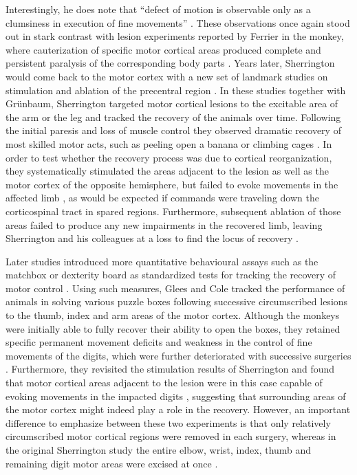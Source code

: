 Interestingly, he does note that \enquote{defect of motion is observable only as a clumsiness in execution of fine movements} \cite{Sherrington1885}. These observations once again stood out in stark contrast with lesion experiments reported by Ferrier in the monkey, where cauterization of specific motor cortical areas produced complete and persistent paralysis of the corresponding body parts \cite{Ferrier1884}. Years later, Sherrington would come back to the motor cortex with a new set of landmark studies on stimulation and ablation of the precentral region \cite{GrahamBrown1913,Leyton1917}. In these studies together with Gr\"unbaum, Sherrington targeted motor cortical lesions to the excitable area of the arm or the leg and tracked the recovery of the animals over time. Following the initial paresis and loss of muscle control they observed dramatic recovery of most skilled motor acts, such as peeling open a banana or climbing cages \cite{Leyton1917}. In order to test whether the recovery process was due to cortical reorganization, they systematically stimulated the areas adjacent to the lesion as well as the motor cortex of the opposite hemisphere, but failed to evoke movements in the affected limb \cite{Leyton1917}, as would be expected if commands were traveling down the corticospinal tract in spared regions. Furthermore, subsequent ablation of those areas failed to produce any new impairments in the recovered limb, leaving Sherrington and his colleagues at a loss to find the locus of recovery \cite{Leyton1917}.

Later studies introduced more quantitative behavioural assays such as the matchbox or dexterity board as standardized tests for tracking the recovery of motor control \cite{Glees1950,Cole1952}. Using such measures, Glees and Cole tracked the performance of animals in solving various puzzle boxes following successive circumscribed lesions to the thumb, index and arm areas of the motor cortex. Although the monkeys were initially able to fully recover their ability to open the boxes, they retained specific permanent movement deficits and weakness in the control of fine movements of the digits, which were further deteriorated with successive surgeries \cite{Glees1950}. Furthermore, they revisited the stimulation results of Sherrington \cite{Leyton1917} and found that motor cortical areas adjacent to the lesion were in this case capable of evoking movements in the impacted digits \cite{Glees1950}, suggesting that surrounding areas of the motor cortex might indeed play a role in the recovery. However, an important difference to emphasize between these two experiments is that only relatively circumscribed motor cortical regions were removed in each surgery, whereas in the original Sherrington study the entire elbow, wrist, index, thumb and remaining digit motor areas were excised at once \cite{Leyton1917}.

